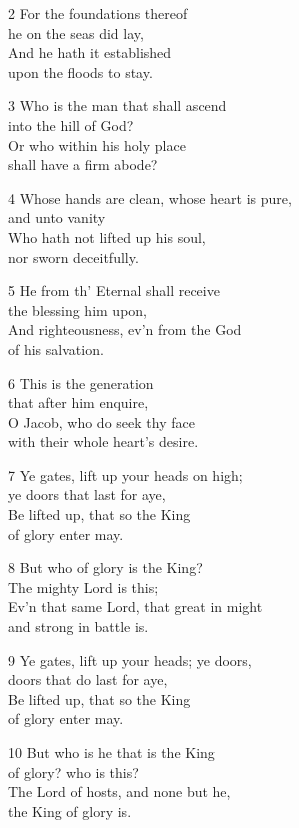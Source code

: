 \begin{multicols}{3}
2 For the foundations thereof\\
he on the seas did lay,\\
And he hath it established\\
upon the floods to stay.

3 Who is the man that shall ascend\\
into the hill of God?\\
Or who within his holy place\\
shall have a firm abode?

4 Whose hands are clean, whose heart is pure,\\
and unto vanity\\
Who hath not lifted up his soul,\\
nor sworn deceitfully.

5 He from th’ Eternal shall receive\\
the blessing him upon,\\
And righteousness, ev’n from the God\\
of his salvation.

6 This is the generation\\
that after him enquire,\\
O Jacob, who do seek thy face\\
with their whole heart’s desire.

7 Ye gates, lift up your heads on high;\\
ye doors that last for aye,\\
Be lifted up, that so the King\\
of glory enter may.

8 But who of glory is the King?\\
The mighty Lord is this;\\
Ev’n that same Lord, that great in might\\
and strong in battle is.

9 Ye gates, lift up your heads; ye doors,\\
doors that do last for aye,\\
Be lifted up, that so the King\\
of glory enter may.

10 But who is he that is the King\\
of glory? who is this?\\
The Lord of hosts, and none but he,\\
the King of glory is.

\begin{center}
\quad{}\quad{}
\end{center}


\end{multicols}
